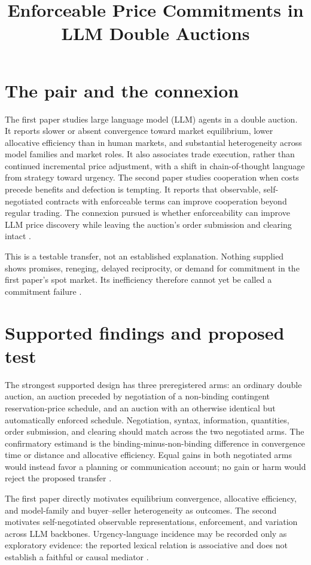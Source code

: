 \documentclass{article}
\title{Enforceable Price Commitments in LLM Double Auctions}
\begin{document}
\maketitle

\section{The pair and the connexion}

The first paper studies large language model (LLM) agents in a double auction.  It reports slower or absent convergence toward market equilibrium, lower allocative efficiency than in human markets, and substantial heterogeneity across model families and market roles.  It also associates trade execution, rather than continued incremental price adjustment, with a shift in chain-of-thought language from strategy toward urgency.  The second paper studies cooperation when costs precede benefits and defection is tempting.  It reports that observable, self-negotiated contracts with enforceable terms can improve cooperation beyond regular trading.  The connexion pursued is whether enforceability can improve LLM price discovery while leaving the auction's order submission and clearing intact .

This is a testable transfer, not an established explanation.  Nothing supplied shows promises, reneging, delayed reciprocity, or demand for commitment in the first paper's spot market.  Its inefficiency therefore cannot yet be called a commitment failure .

\section{Supported findings and proposed test}

The strongest supported design has three preregistered arms: an ordinary double auction, an auction preceded by negotiation of a non-binding contingent reservation-price schedule, and an auction with an otherwise identical but automatically enforced schedule.  Negotiation, syntax, information, quantities, order submission, and clearing should match across the two negotiated arms.  The confirmatory estimand is the binding-minus-non-binding difference in convergence time or distance and allocative efficiency.  Equal gains in both negotiated arms would instead favor a planning or communication account; no gain or harm would reject the proposed transfer .

The first paper directly motivates equilibrium convergence, allocative efficiency, and model-family and buyer--seller heterogeneity as outcomes.  The second motivates self-negotiated observable representations, enforcement, and variation across LLM backbones.  Urgency-language incidence may be recorded only as exploratory evidence: the reported lexical relation is associative and does not establish a faithful or causal mediator .
\end{document}
